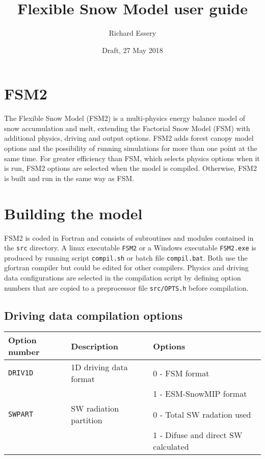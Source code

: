 \documentclass{article}
\title{Flexible Snow Model user guide}
\author{Richard Essery}
\date{Draft, 27 May 2018}
\begin{document}
\maketitle
\parindent0pt

\section{FSM2}

The Flexible Snow Model (FSM2) is a multi-physics energy balance model of snow accumulation and melt, extending the Factorial Snow Model (FSM) with additional physics, driving and output options. FSM2 adds forest canopy model options and the possibility of running simulations for more than one point at the same time. For greater efficiency than FSM, which selects physics options when it is run, FSM2 options are selected when the model is compiled. Otherwise, FSM2 is built and run in the same way as FSM.

\section{Building the model}

FSM2 is coded in Fortran and consists of subroutines and modules contained in the {\tt src} directory. A linux executable {\tt FSM2} or a Windows executable {\tt FSM2.exe} is produced by running script {\tt compil.sh} or batch file {\tt compil.bat}. Both use the gfortran compiler but could be edited for other compilers. Physics and driving data configurations are selected in the compilation script by defining option numbers that are copied to a preprocessor file {\tt src/OPTS.h} before compilation.

\subsection*{Driving data compilation options }
\begin{tabular}{|l|l|l|}
\hline
Option number & Description & Options \\
\hline
{\tt DRIV1D} & 1D driving data format
& 0 - FSM format \\
& & 1 - ESM-SnowMIP format \\
\hline
{\tt SWPART} & SW radiation partition
& 0 - Total SW radation used \\
& & 1 - Difuse and direct SW calculated \\
\hline
\end{tabular}
\end{document}
